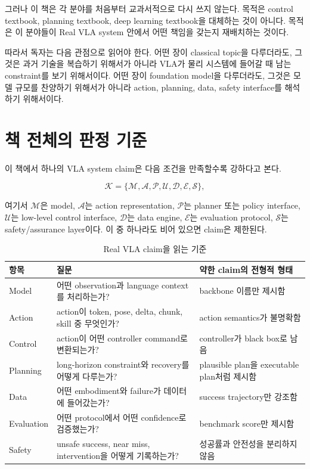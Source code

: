 그러나 이 책은 각 분야를 처음부터 교과서적으로 다시 쓰지 않는다. 목적은 control textbook, planning textbook, deep learning textbook을 대체하는 것이 아니다. 목적은 이 분야들이 Real VLA system 안에서 어떤 책임을 갖는지 재배치하는 것이다.

따라서 독자는 다음 관점으로 읽어야 한다. 어떤 장이 classical topic을 다루더라도, 그것은 과거 기술을 복습하기 위해서가 아니라 VLA가 물리 시스템에 들어갈 때 남는 constraint를 보기 위해서이다. 어떤 장이 foundation model을 다루더라도, 그것은 모델 규모를 찬양하기 위해서가 아니라 action, planning, data, safety interface를 해석하기 위해서이다.

\section{책 전체의 판정 기준}

이 책에서 하나의 VLA system claim은 다음 조건을 만족할수록 강하다고 본다.

\begin{equation}
  \mathcal{K}
  =
  \{ \mathcal{M}, \mathcal{A}, \mathcal{P}, \mathcal{U},
     \mathcal{D}, \mathcal{E}, \mathcal{S} \},
  \label{eq:ch0-claim-contract}
\end{equation}

여기서 $\mathcal{M}$은 model, $\mathcal{A}$는 action representation, $\mathcal{P}$는 planner 또는 policy interface, $\mathcal{U}$는 low-level control interface, $\mathcal{D}$는 data engine, $\mathcal{E}$는 evaluation protocol, $\mathcal{S}$는 safety/assurance layer이다. 이 중 하나라도 비어 있으면 claim은 제한된다.

\begin{table}[ht]
\centering
\caption{Real VLA claim을 읽는 기준}
\label{tab:ch0-claim-criteria}
\small
\begin{tabularx}{\textwidth}{p{24mm}X X}
\toprule
항목 & 질문 & 약한 claim의 전형적 형태 \\
\midrule
Model & 어떤 observation과 language context를 처리하는가? & backbone 이름만 제시함 \\
Action & action이 token, pose, delta, chunk, skill 중 무엇인가? & action semantics가 불명확함 \\
Control & action이 어떤 controller command로 변환되는가? & controller가 black box로 남음 \\
Planning & long-horizon constraint와 recovery를 어떻게 다루는가? & plausible plan을 executable plan처럼 제시함 \\
Data & 어떤 embodiment와 failure가 데이터에 들어갔는가? & success trajectory만 강조함 \\
Evaluation & 어떤 protocol에서 어떤 confidence로 검증했는가? & benchmark score만 제시함 \\
Safety & unsafe success, near miss, intervention을 어떻게 기록하는가? & 성공률과 안전성을 분리하지 않음 \\
\bottomrule
\end{tabularx}
\end{table}

